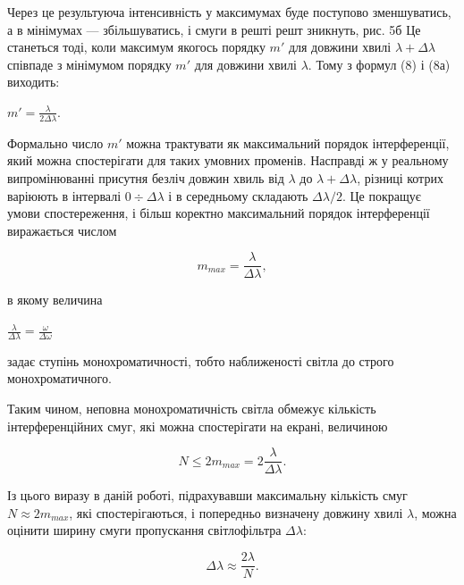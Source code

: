 \documentclass[12pt,a4paper]{article}
\begin{document}
    Через це результуюча інтенсивність у максимумах буде поступово зменшуватись,
    а в мінімумах --- збільшуватись, і смуги в решті решт зникнуть, рис. 5б
    Це станеться тоді, коли максимум якогось порядку $m'$ для довжини
    хвилі $\lambda + \Delta \lambda$ співпаде з мінімумом порядку $m'$ для довжини
    хвилі $\lambda$. Тому з формул (8) і (8а) виходить:

    \begin{center}
        $\displaystyle m' = \frac{\lambda}{2 \Delta \lambda}$.
    \end{center}

    Формально число $m'$ можна трактувати як максимальний порядок інтерференції,
    який можна спостерігати для таких умовних променів. Насправді ж у реальному
    випромінюванні присутня безліч довжин хвиль від $\lambda$ до
    $\lambda + \Delta \lambda$, різниці котрих варіюють в інтервалі
    $0 \div \Delta \lambda$ і в середньому складають $\Delta \lambda / 2$.
    Це покращує умови спостереження, і більш коректно максимальний порядок
    інтерференції виражається числом

    \begin{equation}
        m_{max} = \frac{\lambda}{\Delta \lambda},
        \tag{12}
    \end{equation}

    в якому величина

    \begin{center}
        $\displaystyle \frac{\lambda}{\Delta \lambda} = \frac{\omega}{\Delta \omega}$
    \end{center}

    задає ступінь монохроматичності, тобто наближеності світла до строго монохроматичного.

    Таким чином, неповна монохроматичність світла обмежує кількість інтерференційних смуг,
    які можна спостерігати на екрані, величиною

    \begin{equation}
        N \leq 2m_{max} = 2\frac{\lambda}{\Delta \lambda}.
        \tag{12а}
    \end{equation}

    Із цього виразу в даній роботі, підрахувавши максимальну кількість
    смуг $N \approx 2m_{max}$, які спостерігаються, і попередньо визначену
    довжину хвилі $\lambda$, можна оцінити ширину смуги пропускання світлофільтра $\Delta \lambda$:

    \begin{equation}
        \Delta \lambda \approx \frac{2 \lambda}{N}.
        \tag{13}
    \end{equation}
\end{document}
